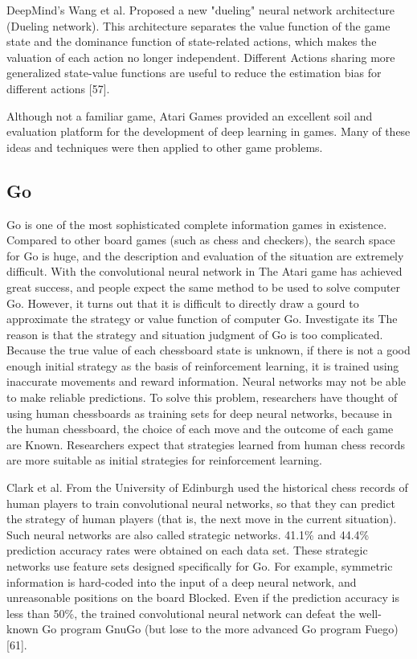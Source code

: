 \documentclass[11pt,en]{elegantpaper}
\begin{document}
DeepMind's Wang et al. Proposed a new "dueling" neural network architecture (Dueling network). This architecture separates the value function of the game state and the dominance function of state-related actions, which makes the valuation of each action no longer independent. Different Actions sharing more generalized state-value functions are useful to reduce the estimation bias for different actions [57].

Although not a familiar game, Atari Games provided an excellent soil and evaluation platform for the development of deep learning in games. Many of these ideas and techniques were then applied to other game problems.

\subsection{Go}
Go is one of the most sophisticated complete information games in existence. Compared to other board games (such as chess and checkers), the search space for Go is huge, and the description and evaluation of the situation are extremely difficult. With the convolutional neural network in The Atari game has achieved great success, and people expect the same method to be used to solve computer Go. However, it turns out that it is difficult to directly draw a gourd to approximate the strategy or value function of computer Go. Investigate its The reason is that the strategy and situation judgment of Go is too complicated. Because the true value of each chessboard state is unknown, if there is not a good enough initial strategy as the basis of reinforcement learning, it is trained using inaccurate movements and reward information. Neural networks may not be able to make reliable predictions. To solve this problem, researchers have thought of using human chessboards as training sets for deep neural networks, because in the human chessboard, the choice of each move and the outcome of each game are Known. Researchers expect that strategies learned from human chess records are more suitable as initial strategies for reinforcement learning.

Clark et al. From the University of Edinburgh used the historical chess records of human players to train convolutional neural networks, so that they can predict the strategy of human players (that is, the next move in the current situation). Such neural networks are also called strategic networks. 41.1\% and 44.4\% prediction accuracy rates were obtained on each data set. These strategic networks use feature sets designed specifically for Go. For example, symmetric information is hard-coded into the input of a deep neural network, and unreasonable positions on the board Blocked. Even if the prediction accuracy is less than 50\%, the trained convolutional neural network can defeat the well-known Go program GnuGo (but lose to the more advanced Go program Fuego) [61].
\end{document}
